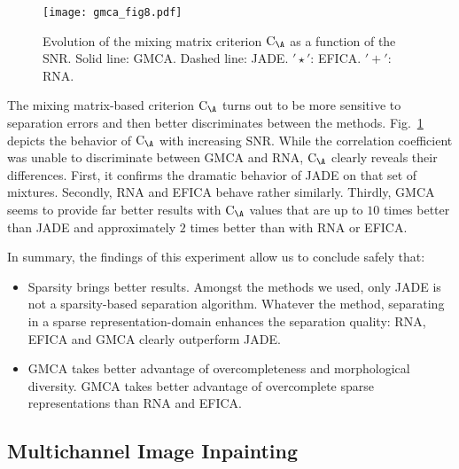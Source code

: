 \begin{figure}[htb]
\begin{minipage}[b]{0.95\linewidth}
                       \centerline{         \texttt{[image: gmca\_fig8.pdf]}}
\end{minipage}
\caption{Evolution of the mixing matrix criterion $\mathrm{C}_{\A}$ as a function of the SNR. Solid line: GMCA. Dashed line: JADE. $'\star'$: EFICA. $'+'$: RNA.}  \label{fig:crit_mixmat}
\end{figure}

The mixing matrix-based criterion $\mathrm{C}_{\A}$ turns out to be more sensitive to separation errors and then better discriminates between the methods. Fig.\ \ref{fig:crit_mixmat} depicts the behavior of $\mathrm{C}_{\A}$ with increasing SNR. While the correlation coefficient was unable to discriminate between GMCA and RNA, $\mathrm{C}_{\A}$ clearly reveals their differences. First, it confirms the dramatic behavior of JADE on that set of mixtures. Secondly, RNA and EFICA behave rather similarly. Thirdly, GMCA  seems to provide far better results with $\mathrm{C}_{\A}$ values that are up to $10$ times better than JADE and approximately $2$ times better than with RNA or EFICA. 

In summary, the findings of this experiment allow us to conclude safely that:
\begin{itemize}
\item Sparsity brings better results. Amongst the methods we used, only JADE is not a sparsity-based separation algorithm. Whatever the method, separating in a sparse representation-domain enhances the separation quality: RNA, EFICA and GMCA clearly outperform JADE.
\item GMCA takes better advantage of overcompleteness and morphological diversity. GMCA takes better advantage of overcomplete sparse representations than RNA and EFICA.
\end{itemize}

 

\subsection{Multichannel Image Inpainting}
\label{sec:inp}


